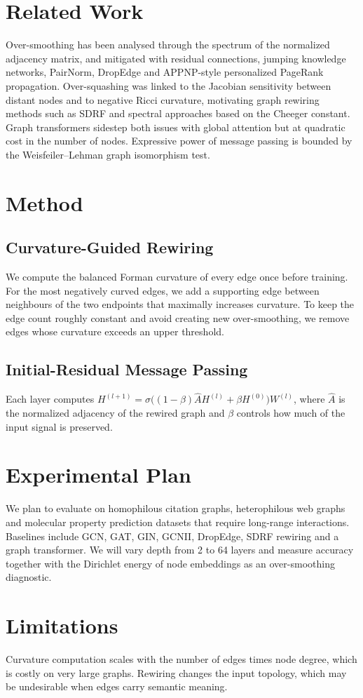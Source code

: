 \documentclass{article}
\begin{document}
\section{Related Work}
Over-smoothing has been analysed through the spectrum of the normalized
adjacency matrix, and mitigated with residual connections, jumping knowledge
networks, PairNorm, DropEdge and APPNP-style personalized PageRank
propagation. Over-squashing was linked to the Jacobian sensitivity between
distant nodes and to negative Ricci curvature, motivating graph rewiring
methods such as SDRF and spectral approaches based on the Cheeger constant.
Graph transformers sidestep both issues with global attention but at quadratic
cost in the number of nodes. Expressive power of message passing is bounded by
the Weisfeiler--Lehman graph isomorphism test.

\section{Method}
\subsection{Curvature-Guided Rewiring}
We compute the balanced Forman curvature of every edge once before training.
For the most negatively curved edges, we add a supporting edge between
neighbours of the two endpoints that maximally increases curvature. To keep
the edge count roughly constant and avoid creating new over-smoothing, we
remove edges whose curvature exceeds an upper threshold.

\subsection{Initial-Residual Message Passing}
Each layer computes $H^{(l+1)} = \sigma\big((1-\beta)\hat{A}H^{(l)} +
\beta H^{(0)}\big)W^{(l)}$, where $\hat{A}$ is the normalized adjacency of the
rewired graph and $\beta$ controls how much of the input signal is preserved.

\section{Experimental Plan}
We plan to evaluate on homophilous citation graphs, heterophilous web graphs
and molecular property prediction datasets that require long-range
interactions. Baselines include GCN, GAT, GIN, GCNII, DropEdge, SDRF rewiring
and a graph transformer. We will vary depth from 2 to 64 layers and measure
accuracy together with the Dirichlet energy of node embeddings as an
over-smoothing diagnostic.

\section{Limitations}
Curvature computation scales with the number of edges times node degree,
which is costly on very large graphs. Rewiring changes the input topology,
which may be undesirable when edges carry semantic meaning.
\end{document}
